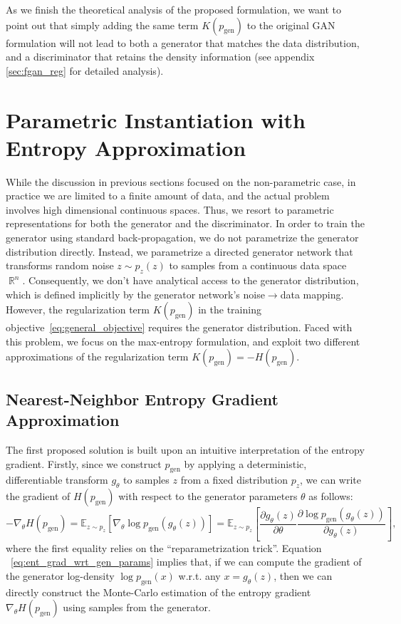 \documentclass[a4paper]{article}
\newcommand{\pg}{p_\text{gen}}
\newcommand{\pz}{p_{z}}
\DeclareMathOperator{\R}{\mathbb{R}}
\begin{document}
As we finish the theoretical analysis of the proposed formulation, we want to point out that simply adding the same term $K(\pg)$ to the original GAN formulation will not lead to both a generator that matches the data distribution, and a discriminator that retains the density information (see appendix \ref{sec:fgan_reg} for detailed analysis).
 \section{Parametric Instantiation with Entropy Approximation}
\label{sec:instantiation}
While the discussion in previous sections focused on the non-parametric case, in practice we are limited to a finite amount of data, and the actual problem involves high dimensional continuous spaces.
Thus, we resort to parametric representations for both the generator and the discriminator.
In order to train the generator using standard back-propagation, we do not parametrize the generator distribution directly. Instead, we parametrize a directed generator network that transforms random noise $z\sim \pz(z)$ to samples from a continuous data space $\R^{n}$.
Consequently, we don't have analytical access to the generator distribution, which is defined implicitly by the generator network's noise$\rightarrow$data mapping.
However, the regularization term $K(\pg)$ in the training objective~\eqref{eq:general_objective} requires the generator distribution.
Faced with this problem, we focus on the max-entropy formulation, and exploit two different approximations of the regularization term $K(\pg)=-H(\pg)$.





\subsection{Nearest-Neighbor Entropy Gradient Approximation}
The first proposed solution is built upon an intuitive interpretation of the entropy gradient.
Firstly, since we construct $\pg$ by applying a deterministic, differentiable transform $g_{\theta}$ to samples $z$ from a fixed distribution $\pz$, we can write the gradient of $H(\pg)$ with respect to the generator parameters $\theta$ as follows:
\begin{equation}
-\nabla_{\theta} H(\pg) = \mathbb{E}_{z \sim p_z} \left[ \nabla_{\theta} \log \pg(g_{\theta}(z)) \right] = \mathbb{E}_{z \sim p_z} \left[ \frac{\partial g_{\theta}(z)}{\partial \theta} \frac{\partial \log \pg(g_{\theta}(z))}{\partial g_{\theta}(z)} \right],
\label{eq:ent_grad_wrt_gen_params}
\end{equation}
where the first equality relies on the ``reparametrization trick''. 
Equation ~\ref{eq:ent_grad_wrt_gen_params} implies that, if we can compute the gradient of the generator log-density $\log \pg(x)$ w.r.t. any $x = g_{\theta}(z)$, then we can directly construct the Monte-Carlo estimation of the entropy gradient $\nabla_{\theta} H(\pg)$ using samples from the generator.
\end{document}
